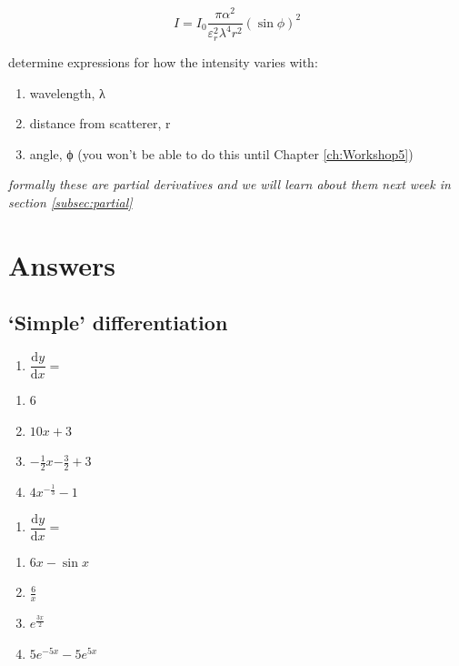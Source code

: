 \documentclass[
]{book}
\providecommand{\tightlist}{%
  \setlength{\itemsep}{0pt}\setlength{\parskip}{0pt}}
\begin{document}
\begin{equation*}
I = I_0 \frac{\pi \alpha ^2}{\varepsilon _r^2 \lambda^4 r^2}(\sin \phi)^2
\end{equation*}

determine expressions for how the intensity varies with:

\begin{enumerate}
\def\labelenumi{\alph{enumi}.}
\tightlist
\item
  wavelength, λ
\item
  distance from scatterer, r
\item
  angle, ϕ (you won't be able to do this until Chapter \ref{ch:Workshop5})
\end{enumerate}

\emph{formally these are partial derivatives and we will learn about them next week in section \ref{subsec:partial}}

\hypertarget{sec:Answers4}{%
\section{Answers}\label{sec:Answers4}}

\hypertarget{simple-differentiation-1}{%
\subsection{`Simple' differentiation}\label{simple-differentiation-1}}

\begin{enumerate}
\def\labelenumi{\arabic{enumi}.}
\tightlist
\item
  \(\dfrac{\textrm{d}y}{\textrm{d}x}=\)
\end{enumerate}

\begin{enumerate}
\def\labelenumi{\alph{enumi}.}
\tightlist
\item
  6
\item
  \(10x+3\)
\item
  \(-\frac{1}{2}x{-\frac{3}{2}}+3\)
\item
  \(4x^{-\frac{1}{3}}-1\)
\end{enumerate}

\begin{enumerate}
\def\labelenumi{\arabic{enumi}.}
\setcounter{enumi}{1}
\tightlist
\item
  \(\dfrac{\textrm{d}y}{\textrm{d}x}=\)
\end{enumerate}

\begin{enumerate}
\def\labelenumi{\alph{enumi}.}
\tightlist
\item
  \(6x-\sin x\)
\item
  \(\frac{6}{x}\)
\item
  \(e^{\frac{3x}{2}}\)
\item
  \(5e^{-5x}-5e^{5x}\)
\end{enumerate}
\end{document}
